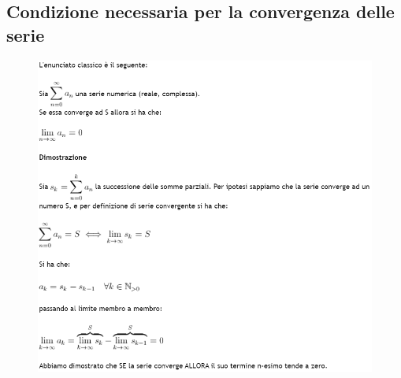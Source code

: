 \documentclass[a4paper, 9pt]{report}
\begin{document}
\subsection*{Condizione necessaria per la convergenza delle serie}\begin{figure}[h!]
    \includegraphics[width=\linewidth]{../dim/convserie.PNG}
\end{figure}
\newpage
\end{document}
